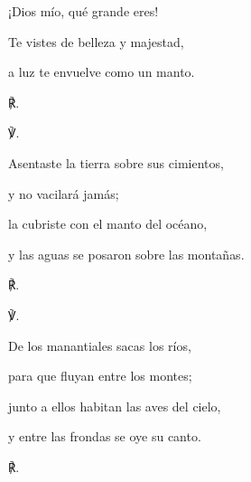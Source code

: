 			\begin{readtabbed}¡Dios mío, qué grande eres! \end{readtabbed}
			
			\begin{readtabbed}Te vistes de belleza y majestad, \end{readtabbed}
			
			\begin{readtabbed}a luz te envuelve como un manto. \begin{readred}℟.\end{readred}\end{readtabbed}
			
			\begin{readbody}\begin{readred}℣.\end{readred} Asentaste la tierra sobre sus cimientos, \end{readbody}
			
			\begin{readtabbed}y no vacilará jamás; \end{readtabbed}
			
			\begin{readtabbed}la cubriste con el manto del océano, \end{readtabbed}
			
			\begin{readtabbed}y las aguas se posaron sobre las montañas. \begin{readred}℟.\end{readred}\end{readtabbed}
			
			\begin{readbody}\begin{readred}℣.\end{readred} De los manantiales sacas los ríos, \end{readbody}
			
			\begin{readtabbed}para que fluyan entre los montes; \end{readtabbed}
			
			\begin{readtabbed}junto a ellos habitan las aves del cielo, \end{readtabbed}
			
			\begin{readtabbed}y entre las frondas se oye su canto. \begin{readred}℟.\end{readred}\end{readtabbed}
			
